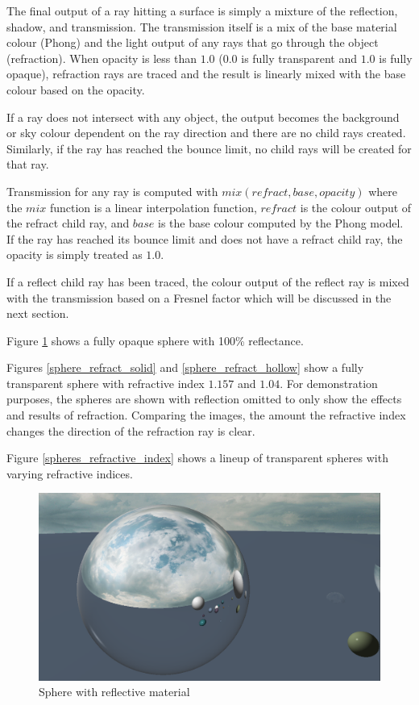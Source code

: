 \documentclass[final]{cmpreport}
\begin{document}
The final output of a ray hitting a surface is simply a mixture of the reflection, shadow, and transmission. The transmission itself is a mix of the base material colour (Phong) and the light output of any rays that go through the object (refraction). When opacity is less than $1.0$ ($0.0$ is fully transparent and $1.0$ is fully opaque), refraction rays are traced and the result is linearly mixed with the base colour based on the opacity.

If a ray does not intersect with any object, the output becomes the background or sky colour dependent on the ray direction and there are no child rays created. Similarly, if the ray has reached the bounce limit, no child rays will be created for that ray. 

Transmission for any ray is computed with $mix(refract, base, opacity)$ where the $mix$ function is a linear interpolation function, $refract$ is the colour output of the refract child ray, and $base$ is the base colour computed by the Phong model. If the ray has reached its bounce limit and does not have a refract child ray, the opacity is simply treated as $1.0$.

If a reflect child ray has been traced, the colour output of the reflect ray is mixed with the transmission based on a Fresnel factor which will be discussed in the next section.

Figure \ref{sphere_reflect} shows a fully opaque sphere with 100\% reflectance.

Figures \ref{sphere_refract_solid} and \ref{sphere_refract_hollow} show a fully transparent sphere with refractive index $1.157$ and $1.04$. For demonstration purposes, the spheres are shown with reflection omitted to only show the effects and results of refraction. Comparing the images, the amount the refractive index changes the direction of the refraction ray is clear.

Figure \ref{spheres_refractive_index} shows a lineup of transparent spheres with varying refractive indices.

\begin{figure}
    \centering
    \includegraphics[width=\textwidth]{img/reflection.png}
    \caption{Sphere with reflective material}
    \label{sphere_reflect}
\end{figure}
\end{document}

